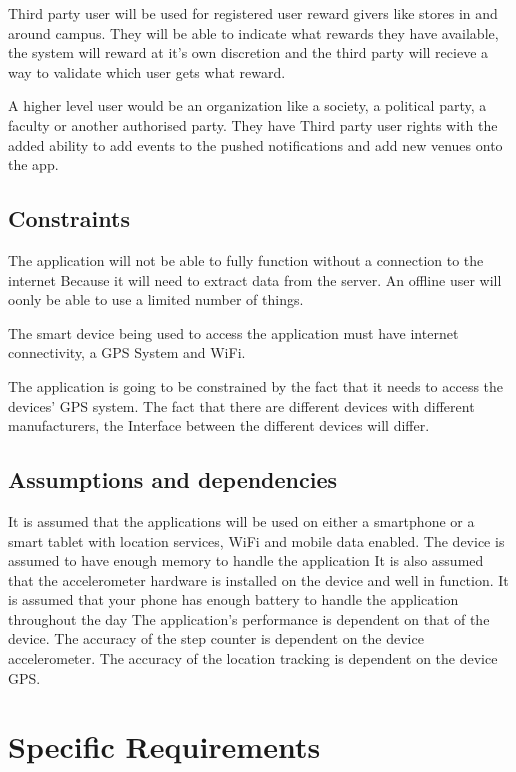 \documentclass[11pt]{article}
\begin{document}
      Third party user will be used for registered user reward givers like stores in and around campus. They will be able to 			indicate what rewards they have available, the system will reward at it’s own discretion and the third party will 			recieve a way to validate which user gets what reward.

      A higher level user would be an organization like a society, a political party, a faculty or another authorised party. 
      They have Third party user rights with the added ability to add events to the pushed notifications and add new venues 			onto the app.

      \subsection{Constraints}
      The application will not be able to fully function without a connection to the internet Because it will need to extract 		data from the server. An offline user will oonly be able to use a limited number of things.

      The smart device being used to access the application must have internet connectivity, a GPS 
      System and WiFi.

      The application is going to be constrained by the fact that it needs to access the devices’ 
      GPS system. The fact that there are different devices with different manufacturers, the Interface between the different 		devices will differ.

      \subsection{Assumptions and dependencies}
      It is assumed that the applications will be used on either a smartphone or a smart tablet with location services, WiFi 			and mobile data enabled.
      The device is assumed to have enough memory to handle the application
      It is also assumed that the accelerometer hardware is installed on the device and well in function.
      It is assumed that your phone has enough battery to handle the application throughout the day
      The application’s performance is dependent on that of the device.
      The accuracy of the step counter is dependent on the device accelerometer.
      The accuracy of the location tracking is dependent on the device GPS.

	\section{Specific Requirements}
	
\end{document}
